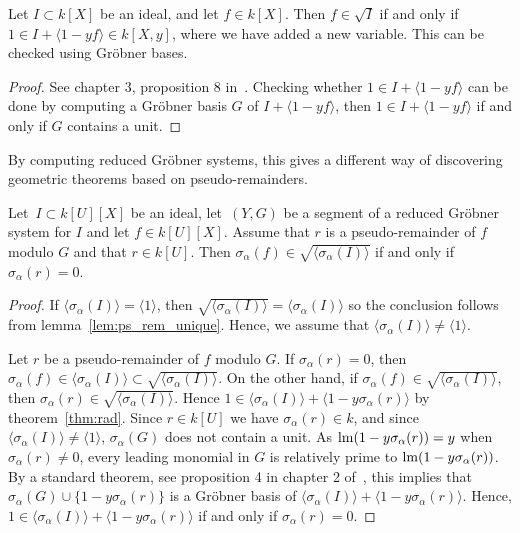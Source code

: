 \begin{theorem}\label{thm:rad}
  Let $I \subset k[X]$ be an ideal, and let $f \in k[X]$. Then $f \in \sqrt{I}$ if and only if $1 \in I + \langle 1 - yf \rangle \in k[X, y]$, where we have added a new variable. This can be checked using Gröbner bases.
\end{theorem}
\begin{proof}
  See chapter 3,  proposition 8 in~\cite{IVA}. Checking whether $1 \in I + \langle 1 - yf \rangle$ can be done by computing a Gröbner basis $G$ of $I + \langle 1 - yf \rangle$, then $1 \in I + \langle 1 - yf \rangle$ if and only if $G$ contains a unit.
\end{proof}

By computing reduced Gröbner systems, this gives a different way of discovering geometric theorems based on pseudo-remainders.

\begin{theorem}\label{thm:in_rad_iff_r_eq_z}
  Let $\,I \subset k[U][X]$ be an ideal, let $\,(Y, G)$ be a segment of a reduced Gröbner system for $I$ and let $f \in k[U][X]$. Assume that $r$ is a pseudo-remainder of $f$ modulo $G$ and that $r \in k[U]$. Then $\sigma_{\alpha}(f) \in \sqrt{\langle \sigma_{\alpha}(I) \rangle}$ if and only if $\sigma_{\alpha}(r) = 0$.
\end{theorem}
\begin{proof}
  If $\langle \sigma_{\alpha}(I) \rangle = \langle 1 \rangle$, then $\sqrt{\langle \sigma_{\alpha}(I) \rangle} = \langle \sigma_{\alpha}(I) \rangle$ so the conclusion follows from lemma~\ref{lem:ps_rem_unique}. Hence, we assume that $\langle \sigma_{\alpha}(I) \rangle \neq \langle 1 \rangle$.

  Let $r$ be a pseudo-remainder of $f$ modulo $G$. If $\sigma_{\alpha}(r) = 0$, then $\sigma_{\alpha}(f) \in \langle \sigma_{\alpha}(I) \rangle \subset \sqrt{\langle \sigma_{\alpha}(I) \rangle}$. On the other hand, if $\sigma_{\alpha}(f) \in \sqrt{\langle \sigma_{\alpha}(I) \rangle}$, then $\sigma_{\alpha}(r) \in \sqrt{\langle \sigma_{\alpha}(I) \rangle} $. Hence $1 \in \langle \sigma_{\alpha}(I) \rangle + \langle 1 - y \sigma_{\alpha}(r) \rangle$ by theorem~\ref{thm:rad}. Since $r \in k[U]$ we have $\sigma_{\alpha}(r) \in k$, and since $\langle \sigma_{\alpha}(I) \rangle \neq \langle 1 \rangle$, $\sigma_{\alpha}(G)$ does not contain a unit. As $\operatorname{lm}(1 - y \sigma_{\alpha}(r)) = y$ when $\sigma_{\alpha}(r) \neq 0$, every leading monomial in $G$ is relatively prime to $\operatorname{lm}(1 - y \sigma_{\alpha}(r))$. By a standard theorem, see proposition 4 in chapter 2 of~\cite{IVA}, this implies that $\sigma_{\alpha}(G) \cup \{1 - y \sigma_{\alpha}(r)\}$ is a Gröbner basis of $\langle \sigma_{\alpha}(I) \rangle + \langle 1 - y \sigma_{\alpha}(r) \rangle$. Hence, $1 \in \langle \sigma_{\alpha}(I) \rangle + \langle 1 - y \sigma_{\alpha}(r) \rangle$ if and only if $\sigma_{\alpha}(r) = 0$.
\end{proof}


